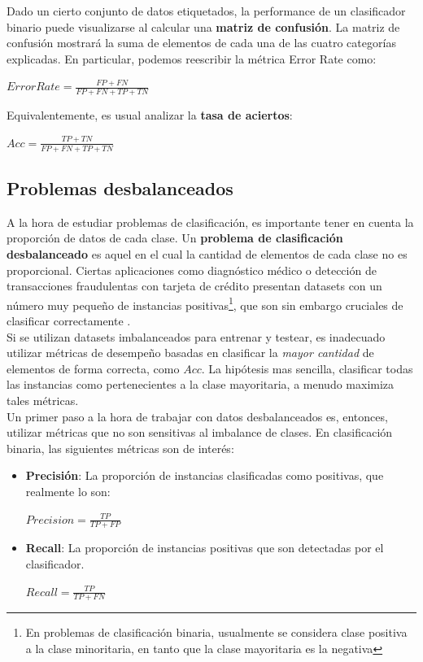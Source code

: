 Dado un cierto conjunto de datos etiquetados, la performance de un clasificador binario puede visualizarse al calcular una \textbf{matriz de confusión}. La matriz de confusión mostrará la suma de elementos de cada una de las cuatro categorías explicadas. En particular, podemos reescribir la métrica Error Rate como: \\

\begin{center}
$ Error Rate = \frac{FP + FN}{FP + FN + TP + TN} $
\end{center}

Equivalentemente, es usual analizar la \textbf{tasa de aciertos}:

\begin{center}
$ Acc = \frac{TP + TN}{FP + FN + TP + TN} $
\end{center}

\subsection{Problemas desbalanceados}
\label{imbalance}

A la hora de estudiar problemas de clasificación, es importante tener en cuenta la proporción de datos de cada clase. Un \textbf{problema de clasificación desbalanceado} es aquel en el cual la cantidad de elementos de cada clase no es proporcional. Ciertas aplicaciones como diagnóstico médico o detección de transacciones fraudulentas con tarjeta de crédito presentan datasets con un número muy pequeño de instancias positivas\footnote{En problemas de clasificación binaria, usualmente se considera clase positiva a la clase minoritaria, en tanto que la clase mayoritaria es la negativa}, que son sin embargo cruciales de clasificar correctamente \cite{imbalanced_svm}. \\

Si se utilizan datasets imbalanceados para entrenar y testear, es inadecuado utilizar métricas de desempeño basadas en clasificar la \textit{mayor cantidad} de elementos de forma correcta, como $Acc$. La hipótesis mas sencilla, clasificar todas las instancias como pertenecientes a la clase mayoritaria, a menudo maximiza tales métricas. \\

Un primer paso a la hora de trabajar con datos desbalanceados es, entonces, utilizar métricas que no son sensitivas al imbalance de clases. En clasificación binaria, las siguientes métricas son de interés:

\begin{itemize}
\item \textbf{Precisión}: La proporción de instancias clasificadas como positivas, que realmente lo son:
\begin{center}
$ Precision =  \frac{TP}{TP + FP}$
\end{center}

\item \textbf{Recall}: La proporción de instancias positivas que son detectadas por el clasificador.
\begin{center}
$ Recall =  \frac{TP}{TP + FN}$
\end{center}

\end{itemize}

